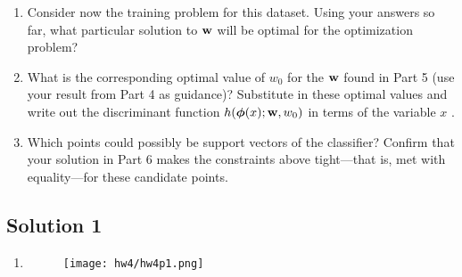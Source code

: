 \documentclass[submit]{harvardml}
\begin{document}
\begin{problem}
\begin{enumerate}
\item Consider now the training problem for this dataset. Using your
  answers so far, what particular solution to $\mathbf{w}$ will be optimal
  for the optimization problem?

\item What is the corresponding optimal value of $w_0$ for the
  $\mathbf{w}$ found in Part 5 (use your result from Part 4 as guidance)?
  Substitute in these optimal values and write out the discriminant
  function $h(\boldsymbol{\phi}(x);\mathbf{w},w_0)$ in terms of the variable $x$ .


\item Which points could possibly be support vectors of the classifier?  Confirm that
  your solution in Part 6 makes the constraints above tight---that is,
  met with equality---for these candidate points.

\end{enumerate}

\end{problem}

\subsection*{Solution 1}

\begin{enumerate}
    \item 
    \begin{figure}[H]
        \texttt{[image: hw4/hw4p1.png]}
        \centering
    \end{figure}
\end{enumerate}

\newpage

\end{document}
